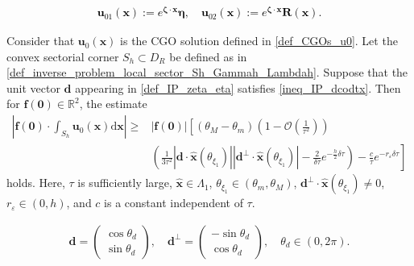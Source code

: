 \documentclass[10pt,a4paper]{amsart}
\begin{document}
	\textcolor{black}{\begin{align} \label{def_IP_u01u02}
			\mathbf{u}_{01}\left(\mathbf{x}\right) := e^{\bm{\zeta} \cdot \mathbf{x}} \bm{\eta}, \quad \mathbf{u}_{02}\left(\mathbf{x}\right) := e^{\bm{\zeta} \cdot \mathbf{x}} \mathbf{R}\left(\mathbf{x}\right).
	\end{align}}

\begin{lemma} \label{lem_IP_est_f0_int_Sh_u0}
	Consider that $ \mathbf{u}_0\left(\mathbf{x}\right) $ is the CGO solution defined in \eqref{def_CGOs_u0}. Let the convex sectorial corner $ S_h\subset D_R $ be defined as in \eqref{def_inverse_problem_local_sector_Sh_Gammah_Lambdah}. Suppose that the unit vector $ \mathbf{d} $ appearing in \eqref{def_IP_zeta_eta} satisfies \eqref{ineq_IP_dcodtx}. Then for $ \mathbf{f}\left(\bm{0}\right) \in \mathbb{R}^2 $, the estimate
	\begin{align*} 
		\left| \mathbf{f}\left(\bm{0}\right) \cdot \int_{S_h} \mathbf{u}_0\left(\mathbf{x}\right) \mathrm{d}\mathbf{x} \right| \geqslant & \left| \mathbf{f}\left(\bm{0}\right) \right| \left[\left(\theta_M-\theta_m\right)\left(1-\mathcal{O}\left(\frac{1}{\tau^2}\right)\right) \right. \\
		& \left.\left(\frac{1}{3 \tau^2}\left|\mathbf{d}\cdot\hat{\mathbf{x}} \left(\theta_{\xi_1}\right)\right| \left|\mathbf{d}^{\perp}\cdot\hat{\mathbf{x}} \left(\theta_{\xi_1}\right)\right| - \frac{2}{\delta\tau} e^{-\frac{h}{2} \delta \tau}\right) - \frac{c}{\tau}e^{-r_{\varepsilon} \delta \tau}\right] 
	\end{align*}
	holds. Here, $ \tau $ is sufficiently large, $ \hat{\mathbf{x}} \in \Lambda_1 $, $ \theta_{\xi_1} \in \left(\theta_m, \theta_M\right) $, $ \mathbf{d}^{\perp}\cdot\hat{\mathbf{x}} \left(\theta_{\xi_1}\right) \neq 0 $, $ r_{\varepsilon}\in\left(0,h\right) $, and $ c $ is a constant independent of $ \tau $.
\end{lemma}

	\begin{align} \label{eq_IP_ddperp_sincosphi}
		\mathbf{d}=\begin{pmatrix}
			\cos\theta_d \\
			\sin\theta_d
		\end{pmatrix} ,\quad
		\mathbf{d}^\perp=\begin{pmatrix}
			-\sin\theta_d \\
			\cos\theta_d
		\end{pmatrix}, \quad\theta_d\in\left(0,2\pi\right).
	\end{align}
\end{document}
